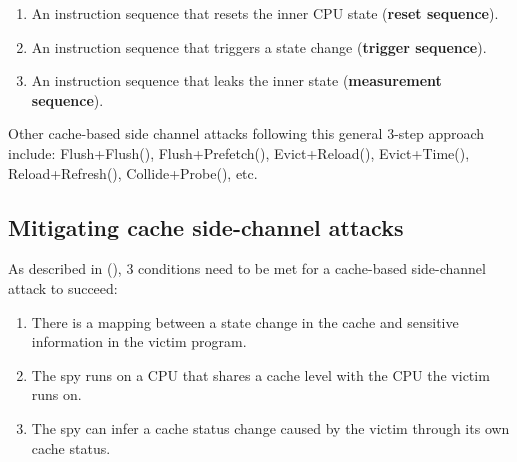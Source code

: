 \documentclass[
  a4paper,
]{report}
\providecommand{\tightlist}{%
  \setlength{\itemsep}{0pt}\setlength{\parskip}{0pt}}
\begin{document}
\begin{enumerate}
\def\labelenumi{\arabic{enumi}.}
\tightlist
\item
  An instruction sequence that resets the inner CPU state
  (\textbf{\label{__index_entry_128}{reset
  sequence}}).
\item
  An instruction sequence that triggers a state change
  (\textbf{\label{__index_entry_129}{trigger
  sequence}}).
\item
  An instruction sequence that leaks the inner state
  (\textbf{\label{__index_entry_130}{measurement
  sequence}}).
\end{enumerate}

Other cache-based side channel attacks following this general 3-step
approach include:
\label{__index_entry_131}{Flush+Flush}(),
\label{__index_entry_132}{Flush+Prefetch}(),
\label{__index_entry_133}{Evict+Reload}(),
\label{__index_entry_134}{Evict+Time}(),
\label{__index_entry_135}{Reload+Refresh}(),
\label{__index_entry_136}{Collide+Probe}(), etc.

\subsection{Mitigating cache side-channel
attacks}\label{mitigating-cache-side-channel-attacks}

As described in (), 3 conditions
need to be met for a cache-based side-channel attack to succeed:

\begin{enumerate}
\def\labelenumi{\arabic{enumi}.}
\tightlist
\item
  There is a mapping between a state change in the cache and sensitive
  information in the victim program.
\item
  The spy runs on a CPU that shares a cache level with the CPU the
  victim runs on.
\item
  The spy can infer a cache status change caused by the victim through
  its own cache status.
\end{enumerate}
\end{document}
